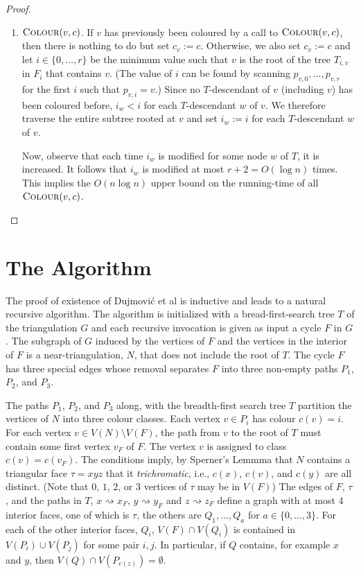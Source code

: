\documentclass[kpfonts]{patmorin}
\begin{document}
\begin{proof}
\begin{enumerate}
    \item $\textsc{Colour}(v,c)$. If $v$ has previously been coloured by a call to $\textsc{Colour}(v,c)$, then there is nothing to do but set $c_v:=c$.  Otherwise, we also set $c_v:=c$ and let $i\in\{0,\ldots,r\}$ be the minimum value such that $v$ is the root of the tree $T_{i,v}$ in $F_i$ that contains $v$.  (The value of $i$ can be found by scanning $p_{v,0},\ldots,p_{v,r}$ for the first $i$ such that $p_{v,i}=v$.)   Since no $T$-descendant of $v$ (including $v$) has been coloured before, $i_w < i$ for each $T$-descendant $w$ of $v$.  We therefore traverse the entire subtree rooted at $v$ and set $i_w:=i$ for each $T$-descendant $w$ of $v$.
    
    Now, observe that each time $i_w$ is modified for some node $w$ of $T$, it is increased.  It follows that $i_w$ is modified at most $r+2=O(\log n)$ times.  This implies the $O(n\log n)$ upper bound on the running-time of all $\textsc{Colour}(v,c)$. \qedhere
  \end{enumerate}
\end{proof}


\section{The Algorithm}

The proof of existence of Dujmović et al \cite{dujmovic.joret.ea:planar} is inductive and leads to a natural recursive algorithm.  The algorithm is initialized with a bread-first-search tree $T$ of the triangulation $G$ and each recursive invocation is given as input a cycle $F$ in $G$. The subgraph of $G$ induced by the vertices of $F$ and the vertices in the interior of $F$ is a near-triangulation, $N$, that does not include the root of $T$.  The cycle $F$ has three special edges whose removal separates $F$ into three non-empty paths $P_1$, $P_2$, and $P_3$.

The paths $P_1$, $P_2$, and $P_3$ along, with the breadth-first search tree $T$ partition the vertices of $N$ into three colour classes.  Each vertex $v\in P_i$ has colour $c(v)=i$.  For each vertex $v\in V(N)\setminus V(F)$, the path from $v$ to the root of $T$ must contain some first vertex $v_F$ of $F$.  The vertex $v$ is assigned to class $c(v)=c(v_F)$.  The conditions imply, by Sperner's Lemmma \cite{X} that $N$ contains a triangular face $\tau=xyz$ that it \emph{trichromatic}, i.e., $c(x)$, $c(v)$, and $c(y)$ are all distinct.  (Note that $0$, $1$, $2$, or $3$ vertices of $\tau$ may be in $V(F)$)  The edges of $F$, $\tau$, and the paths in $T$, $x\rightsquigarrow x_F$, $y\rightsquigarrow y_F$ and $z\rightsquigarrow z_F$ define a graph with at most 4 interior faces, one of which is $\tau$, the others are $Q_1,\ldots,Q_a$ for $a\in\{0,\ldots,3\}$.  For each of the other interior faces, $Q_i$, $V(F)\cap V(Q_i)$ is contained in $V(P_i)\cup V(P_j)$ for some pair $i,j$.  In particular, if $Q$ contains, for example $x$ and $y$, then $V(Q)\cap V(P_{c(z)})=\emptyset$.  
\end{document}
